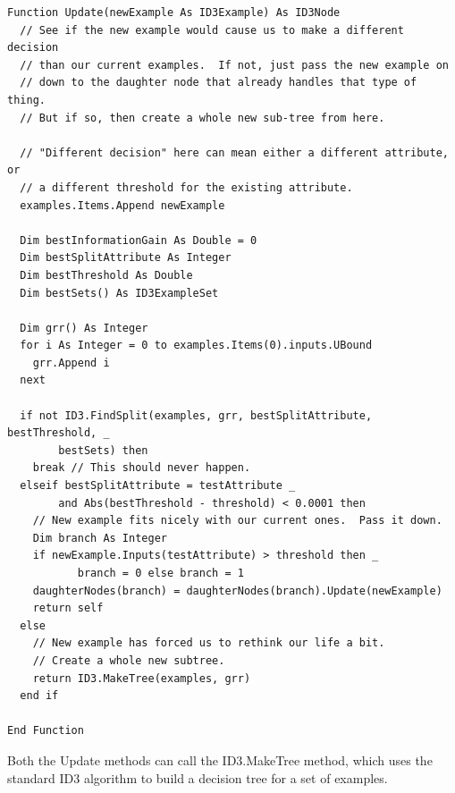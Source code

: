 \documentclass{article}
\begin{document}
\begin{lstlisting}
Function Update(newExample As ID3Example) As ID3Node
  // See if the new example would cause us to make a different decision
  // than our current examples.  If not, just pass the new example on
  // down to the daughter node that already handles that type of thing.
  // But if so, then create a whole new sub-tree from here.
  
  // "Different decision" here can mean either a different attribute, or
  // a different threshold for the existing attribute.
  examples.Items.Append newExample
  
  Dim bestInformationGain As Double = 0
  Dim bestSplitAttribute As Integer
  Dim bestThreshold As Double
  Dim bestSets() As ID3ExampleSet
  
  Dim grr() As Integer
  for i As Integer = 0 to examples.Items(0).inputs.UBound
    grr.Append i
  next
  
  if not ID3.FindSplit(examples, grr, bestSplitAttribute, bestThreshold, _
        bestSets) then
    break // This should never happen.
  elseif bestSplitAttribute = testAttribute _
        and Abs(bestThreshold - threshold) < 0.0001 then
    // New example fits nicely with our current ones.  Pass it down.
    Dim branch As Integer
    if newExample.Inputs(testAttribute) > threshold then _
           branch = 0 else branch = 1
    daughterNodes(branch) = daughterNodes(branch).Update(newExample)
    return self
  else
    // New example has forced us to rethink our life a bit.
    // Create a whole new subtree.
    return ID3.MakeTree(examples, grr)
  end if
  
End Function
\end{lstlisting}

Both the Update methods can call the ID3.MakeTree method, which uses the standard ID3 algorithm to build a decision tree for a set of examples.
\end{document}
